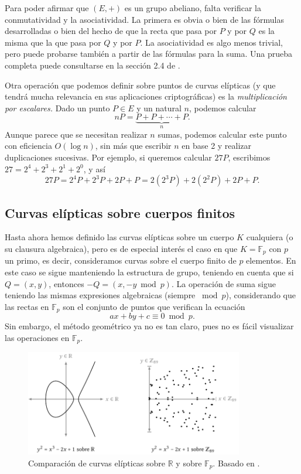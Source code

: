 \documentclass[
  a4paper,
  12pt,
  spanish,
]{scrartcl}
\begin{document}
    Para poder afirmar que $(E, +)$ es un grupo abeliano, falta verificar la conmutatividad y la asociatividad. La primera es obvia o bien de las fórmulas desarrolladas o bien del hecho de que la recta que pasa por $P$ y por $Q$ es la misma que la que pasa por $Q$ y por $P$. La asociatividad es algo menos trivial, pero puede probarse también a partir de las fórmulas para la suma. Una prueba completa puede consultarse en la sección 2.4 de \parencite{elliptic_washington_2008}.
    
    Otra operación que podemos definir sobre puntos de curvas elípticas (y que tendrá mucha relevancia en sus aplicaciones criptográficas) es la \textit{multiplicación por escalares.} Dado un punto $P\in E$ y un natural $n$, podemos calcular \[ nP = \underbrace{P + P + \cdots + P}_{n}.\] Aunque parece que se necesitan realizar $n$ sumas, podemos calcular este punto con eficiencia $O(\log n)$, sin más que escribir $n$ en base 2 y realizar duplicaciones sucesivas. Por ejemplo, si queremos calcular $27P$, escribimos $27 = 2^4 + 2^3 + 2^1 + 2^0$, y así \[ 27P = 2^4P + 2^3P + 2P + P = 2(2^3P) + 2(2^2P) + 2P + P.\]
    
\subsection{Curvas elípticas sobre cuerpos finitos}

Hasta ahora hemos definido las curvas elípticas sobre un cuerpo $K$ cualquiera (o su clausura algebraica), pero es de especial interés el caso en que $K=\mathbb{F}_p$ con $p$ un primo, es decir, consideramos curvas sobre el cuerpo finito de $p$ elementos. En este caso se sigue manteniendo la estructura de grupo, teniendo en cuenta que si $Q = (x,y)$, entonces $-Q = (x, -y \bmod p)$. La operación de suma sigue teniendo las mismas expresiones algebraicas (siempre $\bmod p$), considerando que las rectas en $\mathbb{F}_p$ son el conjunto de puntos que verifican la ecuación \[ ax + by + c \equiv 0 \bmod p. \] Sin embargo, el método geométrico ya no es tan claro, pues no es fácil visualizar las operaciones en $\mathbb{F}_p$.

\begin{figure}[h]
  \centering
  \includegraphics[width=0.85\textwidth]{img/cuerpos-curvas}
  \caption{Comparación de curvas elípticas sobre $\mathbb{R}$ y sobre $\mathbb{F}_p$. Basado en \parencite{eichlseder_elliptic_2016}.}
  \label{fig:cuerpos-curvas}
\end{figure}
\end{document}
